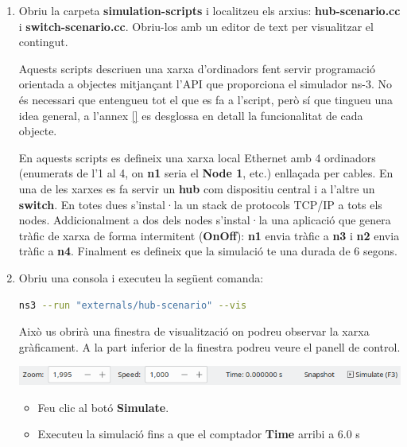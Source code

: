 \documentclass[12pt,a4paper]{article}
\begin{document}
\begin{enumerate}
\item Obriu la carpeta \textbf{simulation-scripts} i localitzeu els arxius: \textbf{hub-scenario.cc} i \textbf{switch-scenario.cc}. Obriu-los amb un editor de text per visualitzar el contingut.

Aquests scripts descriuen una xarxa d'ordinadors fent servir programació orientada a objectes mitjançant l'API que proporciona el simulador ns-3. No és necessari que entengueu tot el que es fa a l'script, però sí que tingueu una idea general, a l'annex \ref{} es desglossa en detall la funcionalitat de cada objecte. 


En aquests scripts es defineix una xarxa local Ethernet amb 4 ordinadors (enumerats de l'1 al 4, on \textbf{n1} seria el \textbf{Node 1}, etc.) enllaçada per cables. En una de les xarxes es fa servir un \textbf{hub} com dispositiu central i a l'altre un \textbf{switch}. En totes dues s'instal·la un stack de protocols TCP/IP a tots els nodes. Addicionalment a dos dels nodes s'instal·la una aplicació que genera tràfic de xarxa de forma intermitent (\textbf{OnOff}): \textbf{n1} envia tràfic a \textbf{n3} i \textbf{n2} envia tràfic a \textbf{n4}. Finalment es defineix que la simulació te una durada de 6 segons.

\item Obriu una consola i executeu la següent comanda:
\begin{lstlisting}[language=bash]
   ns3 --run "externals/hub-scenario" --vis
\end{lstlisting}

Això us obrirà una finestra de visualització on podreu observar la xarxa gràficament. A la part inferior de la finestra podreu veure el panell de control.

  \begin{center}
    \includegraphics[width=1\textwidth]{simulator}   
    \label{sim-controls}
  \end{center}

\begin{itemize}
 \item Feu clic al botó \textbf{Simulate}.
 \item Executeu la simulació fins a que el comptador \textbf{Time} arribi a 6.0 s
\end{itemize}


\end{enumerate}
\end{document}
